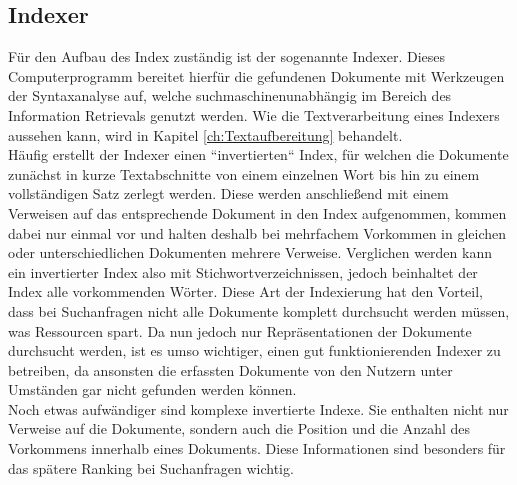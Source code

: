 \subsection{Indexer}
Für den Aufbau des Index zuständig ist der sogenannte Indexer. Dieses Computerprogramm bereitet hierfür die gefundenen Dokumente mit Werkzeugen der Syntaxanalyse auf, welche suchmaschinenunabhängig im Bereich des Information Retrievals genutzt werden. Wie die Textverarbeitung eines Indexers aussehen kann, wird in Kapitel \ref{ch:Textaufbereitung} behandelt.\\
Häufig erstellt der Indexer einen ``invertierten`` Index, für welchen die Dokumente zunächst in kurze Textabschnitte von einem einzelnen Wort bis hin zu einem vollständigen Satz zerlegt werden. Diese werden anschließend mit einem Verweisen auf das entsprechende Dokument in den Index aufgenommen, kommen dabei nur einmal vor und halten deshalb bei mehrfachem Vorkommen in gleichen oder unterschiedlichen Dokumenten mehrere Verweise. Verglichen werden kann ein invertierter Index also mit Stichwortverzeichnissen, jedoch beinhaltet der Index alle vorkommenden Wörter. Diese Art der Indexierung hat den Vorteil, dass bei Suchanfragen nicht alle Dokumente komplett durchsucht werden müssen, was Ressourcen spart. Da nun jedoch nur Repräsentationen der Dokumente durchsucht werden, ist es umso wichtiger, einen gut funktionierenden Indexer zu betreiben, da ansonsten die erfassten Dokumente von den Nutzern unter Umständen gar nicht gefunden werden können. \cite{suchmverst}\\
Noch etwas aufwändiger sind komplexe invertierte Indexe. Sie enthalten nicht nur Verweise auf die Dokumente, sondern auch die Position und die Anzahl des Vorkommens innerhalb eines Dokuments. Diese Informationen sind besonders für das spätere Ranking bei Suchanfragen wichtig. \cite{suchmverst}